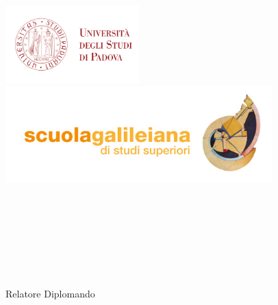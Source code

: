 \begin{titlepage}
	\begin{addmargin}[-1cm]{-3cm}
    \begin{center}
        \large

				\vspace{-3cm}

        \includegraphics[height=3cm]{gfx/logo_unipd_named.png}
				\hfill
				\includegraphics[height=3.7cm]{gfx/logo_gali.jpg}

        \vspace{1cm}

        \begingroup
            \color{Maroon}\spacedallcaps{\myUni} \\
						\color{Maroon}\spacedlowsmallcaps{\myFaculty}
        \endgroup

				\vspace{3cm}

				\color{Maroon}\spacedlowsmallcaps{\myDepartment} \\ \medskip

				\small \color{Maroon}{Tesi di Diploma Galileiano} \\ \medskip

				\vspace{1.5cm}

				\begingroup
						\Huge \color{Maroon}\spacedallcaps{\myTitle} \\ \bigskip
				\endgroup

				\vfill

				\color{Maroon}Relatore \hfill Diplomando \\ \medskip
				\color{Maroon}\myProf \hfill \myName


\end{center}
\end{addmargin}
\end{titlepage}
